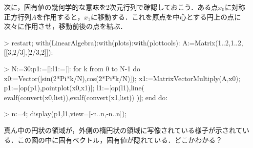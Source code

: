 次に，固有値の幾何学的な意味を2次元行列で確認しておこう．ある点$x_0$に対称正方行列$A$を作用すると，$x_1$に移動する．これを原点を中心とする円上の点に次々に作用させ，移動前後の点を結ぶ．

\begin{MapleInput}
> restart;
  with(LinearAlgebra):with(plots):with(plottools):
  A:=Matrix(1..2,1..2,[[3,2/3],[2/3,2]]):
\end{MapleInput}


\begin{MapleInput}
> N:=30:p1:=[]:l1:=[]:
for k from 0 to N-1 do
  x0:=Vector([sin(2*Pi*k/N),cos(2*Pi*k/N)]);
  x1:=MatrixVectorMultiply(A,x0);
  p1:=[op(p1),pointplot({x0,x1})];
  l1:=[op(l1),line( evalf(convert(x0,list)),evalf(convert(x1,list)) )];
end do:

> n:=4;
  display(p1,l1,view=[-n..n,-n..n]);
\end{MapleInput}

真ん中の円状の領域が，外側の楕円状の領域に写像されている様子が示されている．この図の中に固有ベクトル，固有値が隠れている．どこかわかる？

